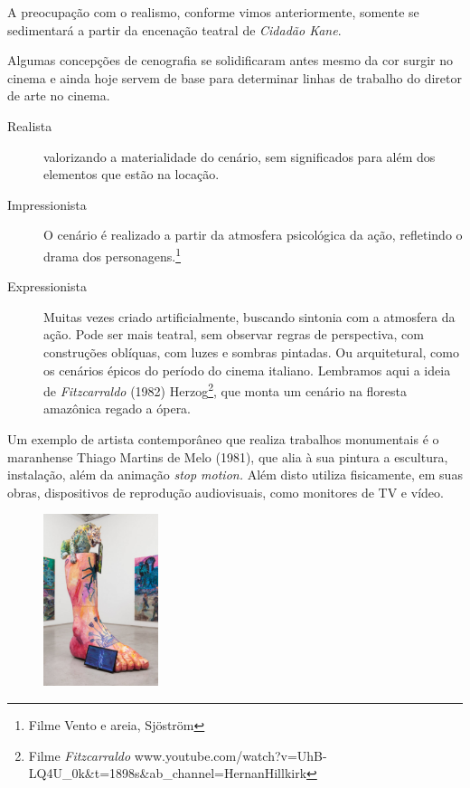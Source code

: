 A preocupação com o realismo, conforme vimos anteriormente, somente se
sedimentará a partir da encenação teatral de \emph{Cidadão Kane}.

Algumas concepções de cenografia se solidificaram antes mesmo da cor
surgir no cinema e ainda hoje servem de base para determinar linhas de
trabalho do diretor de arte no cinema.

\begin{description}
	\item[Realista] valorizando a materialidade do cenário, sem significados
		para além dos elementos que estão na locação.

	\item[Impressionista] O cenário é realizado a partir da atmosfera
		psicológica da ação, refletindo o drama dos personagens.\footnote{Filme
			Vento e areia, Sjöström
			}

	\item[Expressionista] Muitas vezes criado artificialmente, buscando
		sintonia com a atmosfera da ação. Pode ser mais teatral, sem observar
		regras de perspectiva, com construções oblíquas, com luzes e sombras
		pintadas. Ou arquitetural, como os cenários épicos do período do cinema
		italiano. Lembramos aqui a ideia de \emph{Fitzcarraldo} (1982)
		Herzog\footnote{Filme \emph{Fitzcarraldo}
			www.youtube.com/watch?v=UhB-LQ4U\_0k\&t=1898s\&ab\_channel=HernanHillkirk},
		que monta um cenário na floresta amazônica regado a ópera.
\end{description}

Um exemplo de artista contemporâneo que realiza trabalhos monumentais é
o maranhense Thiago Martins de Melo (1981), que alia à sua pintura a
escultura, instalação, além da animação \emph{stop motion.} Além disto
utiliza fisicamente, em suas obras, dispositivos de reprodução
audiovisuais, como monitores de TV e vídeo.

\begin{figure}
	\caption{}
	\includegraphics[width=1.32029in,height=1.97872in]{figuras/de-melo-coluna-anda-sobre-garras.pdf.compressed.pdf}
\end{figure}

